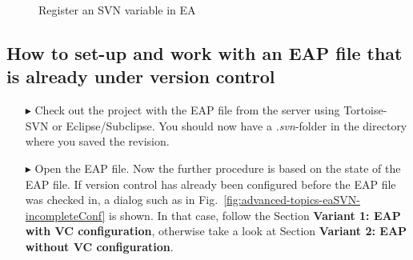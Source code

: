 \begin{figure}[htbp]
\begin{center}
	\caption{Register an SVN variable in EA}
  	\label{fig:advanced-topics-eaSVN-rightclick}
\end{center}
\end{figure}

\subsection{How to set-up and work with an EAP file that is already under version control}

\begin{enumerate}
  \item[$\blacktriangleright$] Check out the project with the EAP file from the server using Tortoise-SVN or Eclipse/Subclipse. 
  You should now have a \textit{.svn}-folder in the directory where you saved the revision.
  \item[$\blacktriangleright$] Open the EAP file. Now the further procedure is based on the state of the EAP file. If version control has already been configured before the EAP file was checked in, a dialog such as in Fig.~\ref{fig:advanced-topics-eaSVN-incompleteConf} is shown. In that case, follow the Section \textbf{Variant 1: EAP with VC configuration}, otherwise take a look at Section \textbf{Variant 2: EAP without VC configuration}.
\end{enumerate}

